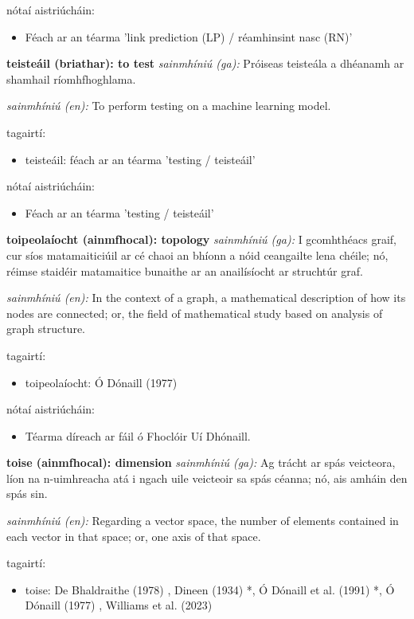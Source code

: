 \documentclass{article}
\begin{document}
nótaí aistriúcháin:
\begin{itemize}
	\item Féach ar an téarma 'link prediction (LP) / réamhinsint nasc (RN)'
\end{itemize}


\textbf{teisteáil (briathar): to test}
\textit{sainmhíniú (ga):} Próiseas teisteála a dhéanamh ar shamhail ríomhfhoghlama.

\textit{sainmhíniú (en):} To perform testing on a machine learning model.

tagairtí:
\begin{itemize}
	\item teisteáil: féach ar an téarma 'testing / teisteáil'
\end{itemize}

nótaí aistriúcháin:
\begin{itemize}
	\item Féach ar an téarma 'testing / teisteáil'
\end{itemize}


\textbf{toipeolaíocht (ainmfhocal): topology}
\textit{sainmhíniú (ga):} I gcomhthéacs graif, cur síos matamaiticiúil ar cé chaoi an bhíonn a nóid ceangailte lena chéile; nó, réimse staidéir matamaitice bunaithe ar an anailísíocht ar struchtúr graf.

\textit{sainmhíniú (en):} In the context of a graph, a mathematical description of how its nodes are connected; or, the field of mathematical study based on analysis of graph structure.

tagairtí:
\begin{itemize}
	\item toipeolaíocht: Ó Dónaill (1977) \cite{odonaill}
\end{itemize}

nótaí aistriúcháin:
\begin{itemize}
	\item Téarma díreach ar fáil ó Fhoclóir Uí Dhónaill.
\end{itemize}


\textbf{toise (ainmfhocal): dimension}
\textit{sainmhíniú (ga):} Ag trácht ar spás veicteora, líon na n-uimhreacha atá i ngach uile veicteoir sa spás céanna; nó, ais amháin den spás sin.

\textit{sainmhíniú (en):} Regarding a vector space, the number of elements contained in each vector in that space; or, one axis of that space.

tagairtí:
\begin{itemize}
	\item toise: De Bhaldraithe (1978) \cite{de-bhaldraithe}, Dineen (1934) \cite{dineen}*, Ó Dónaill et al. (1991) \cite{focloir-beag}*, Ó Dónaill (1977) \cite{odonaill}, Williams et al. (2023) \cite{storchiste}
\end{itemize}
\end{document}
